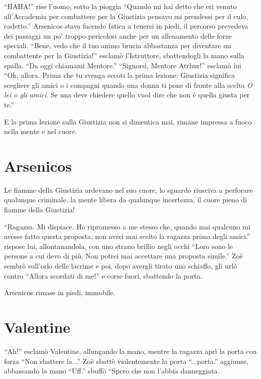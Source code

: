     ``HAHA!'' rise l'uomo, sotto la pioggia ``Quando mi hai detto che eri venuto all'Accademia per combattere per la
    Giustizia pensavo mi prendessi per il culo, cadetto.'' Arsenicos stava facendo fatica a tenersi in piedi, il
    percorso prevedeva dei passaggi un po' troppo pericolosi anche per un allenamento delle forze speciali. ``Bene, vedo
    che il tuo animo brucia abbastanza per diventare un combattente per la Giustizia!'' esclamò l'Istruttore,
    sbattendogli la mano sulla spalla. ``Da oggi chiamami Mentore.'' ``Signorsì, Mentore Atrhur!'' esclamò lui ``Ok, allora.
    Prima che tu svenga eccoti la prima lezione: Giustizia significa scegliere gli amici o i compagni quando una donna
    ti pone di fronte alla scelta \emph{O lei o gli amici}. Se una deve chiedere quello vuol dire che non è quella
    giusta per te.''

    E la prima lezione sulla Giustizia non si dimentica mai, rimane impressa a fuoco nella mente e nel cuore.

  \section*{Arsenicos}

    Le fiamme della Giustizia ardevano nel suo cuore, lo sguardo riusciva a perforare qualunque criminale, la mente
    libera da qualunque incertezza, il cuore pieno di fiamme della Giustizia!

    ``Ragazza. Mi dispiace. Ho ripromesso a me stesso che, quando mai qualcuno mi avesse fatto questa proposta, non
    avrei mai scelto la ragazza prima degli amici.'' rispose lui, allontanandola, con uno strano brillio negli occhi
    ``Loro sono le persone a cui devo di più. Non potrei mai accettare una proposta simile.'' Zoè sembrò sull'orlo delle
    lacrime e poi, dopo avergli tirato uno schiaffo, gli urlò contro ``Allora scordati di me!'' e corse fuori, sbattendo
    la porta.

    Arsenicos rimase in piedi, immobile.

  \section*{Valentine}
    
    ``Ah!'' esclamò Valentine, allungando la mano, mentre la ragazza aprì la porta con forza ``Non sbattere la...'' Zoè
    sbattè violentemente la porta ``...porta.'' aggiunse, abbassando la mano ``Uff.'' sbuffò ``Spero che non l'abbia
    danneggiata.

